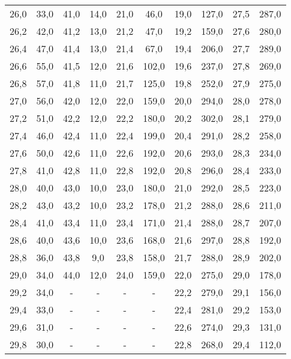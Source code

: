 \begin{table}[htp]
\begin{center}
\begin{tabular}{cc|cc|cc|cc|cc}
                        26,0 & 33,0 & 41,0 & 14,0 & 21,0 & 46,0 & 19,0 & 127,0 & 27,5 & 287,0\\
                        26,2 & 42,0 & 41,2 & 13,0 & 21,2 & 47,0 & 19,2 & 159,0 & 27,6 & 280,0\\
                        26,4 & 47,0 & 41,4 & 13,0 & 21,4 & 67,0 & 19,4 & 206,0 & 27,7 & 289,0\\
                        26,6 & 55,0 & 41,5 & 12,0 & 21,6 & 102,0 & 19,6 & 237,0 & 27,8 & 269,0\\
                        26,8 & 57,0 & 41,8 & 11,0 & 21,7 & 125,0 & 19,8 & 252,0 & 27,9 & 275,0\\
                        27,0 & 56,0 & 42,0 & 12,0 & 22,0 & 159,0 & 20,0 & 294,0 & 28,0 & 278,0\\
                        27,2 & 51,0 & 42,2 & 12,0 & 22,2 & 180,0 & 20,2 & 302,0 & 28,1 & 279,0\\
                        27,4 & 46,0 & 42,4 & 11,0 & 22,4 & 199,0 & 20,4 & 291,0 & 28,2 & 258,0\\
                        27,6 & 50,0 & 42,6 & 11,0 & 22,6 & 192,0 & 20,6 & 293,0 & 28,3 & 234,0\\
                        27,8 & 41,0 & 42,8 & 11,0 & 22,8 & 192,0 & 20,8 & 296,0 & 28,4 & 233,0\\
                        28,0 & 40,0 & 43,0 & 10,0 & 23,0 & 180,0 & 21,0 & 292,0 & 28,5 & 223,0\\
                        28,2 & 43,0 & 43,2 & 10,0 & 23,2 & 178,0 & 21,2 & 288,0 & 28,6 & 211,0\\
                        28,4 & 41,0 & 43,4 & 11,0 & 23,4 & 171,0 & 21,4 & 288,0 & 28,7 & 207,0\\
                        28,6 & 40,0 & 43,6 & 10,0 & 23,6 & 168,0 & 21,6 & 297,0 & 28,8 & 192,0\\
                        28,8 & 36,0 & 43,8 & 9,0 & 23,8 & 158,0 & 21,7 & 288,0 & 28,9 & 202,0\\
                        29,0 & 34,0 & 44,0 & 12,0 & 24,0 & 159,0 & 22,0 & 275,0 & 29,0 & 178,0\\
                        29,2 & 34,0 & - & - & - & - & 22,2 & 279,0 & 29,1 & 156,0\\
                        29,4 & 33,0 & - & - & - & - & 22,4 & 281,0 & 29,2 & 153,0\\
                        29,6 & 31,0 & - & - & - & - & 22,6 & 274,0 & 29,3 & 131,0\\
                        29,8 & 30,0 & - & - & - & - & 22,8 & 268,0 & 29,4 & 112,0\\

\end{tabular}
\end{center}
\end{table}
